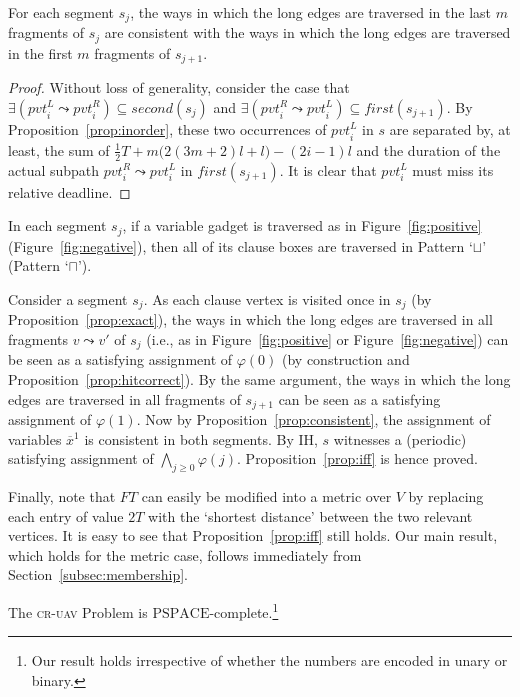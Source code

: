 \documentclass[envcountsame]{llncs}
\begin{document}
\vspace{-0.5cm}

\begin{proposition}\label{prop:consistent}
For each segment $s_j$, the ways in which the long edges are traversed 
in the last $m$ fragments of $s_j$ are consistent with
the ways in which the long edges are traversed in the first $m$ fragments
of $s_{j+1}$.
\end{proposition}
\begin{proof}
Without loss of generality, consider the case that
$\exists (\mathit{pvt}_i^L \leadsto \mathit{pvt}_i^R) \subseteq \mathit{second}(s_{j})$
and $\exists (\mathit{pvt}_i^R \leadsto \mathit{pvt}_i^L) \subseteq \mathit{first}(s_{j+1})$.
By Proposition~\ref{prop:inorder}, these two occurrences of $\mathit{pvt}_i^L$
in $s$ are separated by, at least, the sum of $\frac{1}{2}T + m\big(2(3m+2)l + l\big)  - (2i - 1)l$
and the duration of the actual subpath $\mathit{pvt}_i^R \leadsto \mathit{pvt}_i^L$ in $\mathit{first}(s_{j+1})$.
It is clear that $\mathit{pvt}_i^L$ must miss its relative deadline.
\end{proof}

\begin{proposition}\label{prop:hitcorrect}
In each segment $s_j$, if a variable gadget is traversed as in Figure~\ref{fig:positive} (Figure~\ref{fig:negative}), 
then all of its clause boxes are traversed in Pattern `$\sqcup$' (Pattern `$\sqcap$').
\end{proposition}


Consider a segment $s_j$. As each clause vertex is visited once in $s_j$ (by Proposition~\ref{prop:exact}),
the ways in which the long edges are traversed in all fragments $v \leadsto v'$ of $s_j$ (i.e., as in Figure~\ref{fig:positive} or Figure~\ref{fig:negative})
can be seen as a satisfying assignment of $\varphi(0)$ (by construction and Proposition~\ref{prop:hitcorrect}).
By the same argument, the ways in which the long edges are traversed in all fragments of $s_{j+1}$
can be seen as a satisfying assignment of $\varphi(1)$.
Now by Proposition~\ref{prop:consistent}, the assignment of variables
$\overline{x}^1$ is consistent in both segments. 
By IH, $s$ witnesses a (periodic) satisfying assignment of
$\bigwedge_{j \geq 0} \varphi(j)$. Proposition~\ref{prop:iff} is hence proved.

Finally, note that $\mathit{FT}$ can easily be modified into a metric
over $V$ by replacing each entry of value $2T$ with the `shortest
distance' between the two relevant vertices.  It is easy to see that
Proposition~\ref{prop:iff} still holds.  Our main result, which holds
for the metric case, follows immediately from
Section~\ref{subsec:membership}.
\begin{theorem}
The \textsc{cr-uav} Problem is $\mathrm{PSPACE}$-complete.\footnote{Our result holds irrespective
of whether the numbers are encoded in unary or binary.}
\end{theorem}
\end{document}
